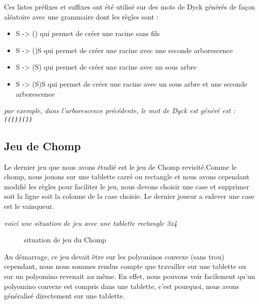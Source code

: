   Ces listes préfixes et suffixes ont été utilisé sur des mots de Dyck générés de façon aléatoire avec une grammaire dont les règles sont :

  \begin{itemize}
    \item S -> () qui permet de créer une racine sans fils
    \item S -> ()S qui permet de créer une racine avec une seconde arborescence
    \item S -> (S) qui permet de créer une racine avec un sous arbre
    \item S -> (S)S qui permet de créer une racine avec un sous arbre et une seconde arborescence
  \end{itemize}

  \textit{par exemple, dans l'arborescence précédente, le mot de Dyck est généré est : \texttt{((())())}}

\subsection{Jeu de Chomp}
\label{sub:Jeu de Chomp}

Le dernier jeu que nous avons étudié est le jeu de Chomp revisité.Comme le chomp, nous jouons sur une tablette carré ou rectangle et nous avons cependant modifié les règles pour faciliter le jeu, nous devons choisir une case et supprimer soit la ligne soit la colonne de la case choisie. Le dernier joueur a enlever une case est le vainqueur.

\textit{
  voici une situation de jeu avec une tablette rectangle 3x4
}

\begin{figure}[h]
  \centering
  \caption{situation de jeu du Chomp}
 
\end{figure}
Au démarrage, ce jeu devait être sur les polyominos convexe (sans trou) cependant, nous nous sommes rendus compte que travailler sur une tablette ou sur un polyomino revenait au même. En effet, nous pouvons voir facilement qu'un polyomino convexe est compris dans une tablette, c'est pourquoi, nous avons généralisé directement sur une tablette.

